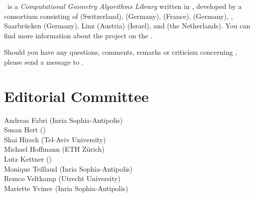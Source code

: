 
\cgal\ is a {\em Computational Geometry Algorithms Library} written in \CC, 
developed by a consortium consisting of
 (Switzerland), 
 (Germany), 
 (France),
 (Germany),
,
Saarbr\"ucken (Germany),
 Linz (Austria)
 (Israel), and
 (the Netherlands). 
You can find more information about the project on the
.


Should you have any questions, comments, remarks or criticism concerning 
\cgal, please send a message to 
.

\section*{Editorial Committee}

Andreas Fabri ({\sc Inria} Sophia-Antipolis) \\
Susan Hert ()\\
Shai Hirsch (Tel-Aviv University) \\
Michael Hoffmann (ETH Z\"urich) \\
Lutz Kettner ()\\
Monique Teillaud ({\sc Inria} Sophia-Antipolis)\\
Remco Veltkamp (Utrecht University)\\
Mariette Yvinec ({\sc Inria} Sophia-Antipolis)\\



